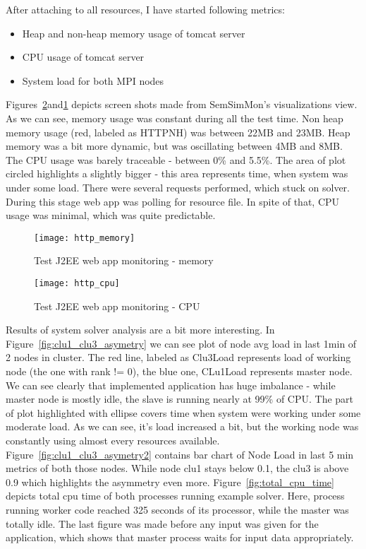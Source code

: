 After attaching to all resources, I have started following metrics:
\begin{itemize}
\item Heap and non-heap memory usage of tomcat server
\item CPU usage of tomcat server
\item System load for both MPI nodes
\end{itemize}

Figures~\ref{fig:http_cpu}and\ref{fig:http_memory} depicts screen shots made from SemSimMon\rq{}s visualizations view. As we can see, memory usage was constant during all the test time. Non heap memory usage (red, labeled as HTTPNH) was between 22MB and 23MB. Heap memory was a bit more dynamic, but was oscillating between 4MB and 8MB. The CPU usage was barely traceable - between 0\% and 5.5\%. The area of plot circled highlights a slightly bigger - this area represents time, when system was under some load. There were several requests performed, which stuck on solver. During this stage web app was polling for resource file. In spite of that, CPU usage was minimal, which was quite predictable. 

\begin{figure}[ht]
\centering
\texttt{[image: http\_memory]}
\caption{Test J2EE web app monitoring - memory}
\label{fig:http_memory}
\end{figure}

\begin{figure}[ht]
\centering
\texttt{[image: http\_cpu]}
\caption{Test J2EE web app monitoring - CPU}
\label{fig:http_cpu}
\end{figure}


Results of system solver analysis are a bit more interesting. In Figure~\ref{fig:clu1_clu3_asymetry} we can see plot of node avg load in last 1min of 2 nodes in cluster. The red line, labeled as Clu3Load represents load of working node (the one with rank != 0), the blue one, CLu1Load represents master node. We can see clearly that implemented application has huge imbalance - while master node is mostly idle, the slave is running nearly at 99\% of CPU. The part of plot highlighted with ellipse covers time when system were working under some moderate load. As we can see, it\rq{}s load increased a bit, but the working node was constantly using almost every resources available. Figure~\ref{fig:clu1_clu3_asymetry2} contains bar chart of Node Load in last 5 min metrics of both those nodes. While node clu1 stays below 0.1, the clu3 is above 0.9 which highlights the asymmetry even more. Figure~\ref{fig:total_cpu_time} depicts total cpu time of both processes running example solver. Here, process running worker code reached 325 seconds of its processor, while the master was totally idle. The last figure was made before any input was given for the application, which shows that master process waits for input data appropriately.


